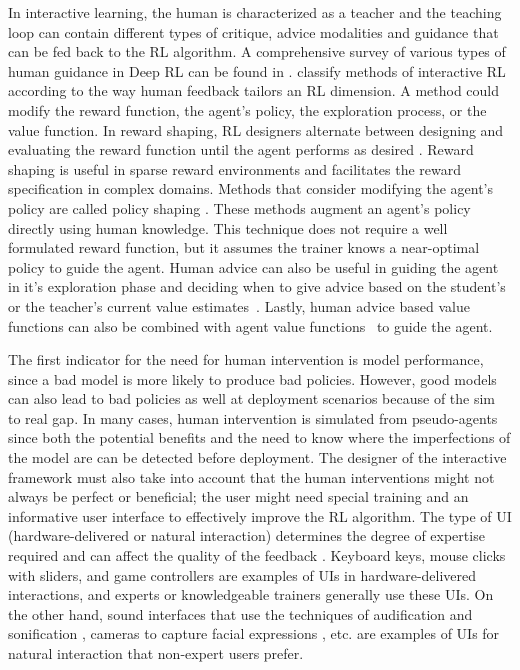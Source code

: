 \documentclass[twoside,11pt]{article}
\begin{document}
In interactive learning, the human is characterized as a teacher and the teaching loop can contain different types of critique, advice modalities and guidance that can be fed back to the RL algorithm. A comprehensive survey of various types of human guidance in Deep RL can be found in \cite{zhang2019leveraging}. \cite{Arzate:2020:SurveyInteractiveRL} classify methods of interactive RL according to the way human feedback tailors an RL dimension. A method could modify the reward function, the agent's policy, the exploration process, or the value function.  In reward shaping, RL designers alternate between designing and evaluating the reward function until the agent performs as desired \citep{ng:99}. Reward shaping is useful in sparse reward environments and facilitates the reward specification in complex domains. Methods that consider modifying the agent's policy are called policy shaping \citep{griffith2013policy}. These methods augment an agent's policy directly using human knowledge. This technique does not require a well formulated reward function, but it assumes the trainer knows a near-optimal policy to guide the agent. Human advice can also be useful in guiding the agent in it’s exploration phase and deciding when to give advice based on the student’s or the teacher’s current value estimates~\citep{amir2016interactive}. Lastly, human advice based value functions can also be combined with agent value functions~\citep{taylor2011integrating} to guide the agent. 


The first indicator for the need for human intervention is model performance, since a bad model is more likely to produce bad policies. However, good models can also lead to bad policies as well at deployment scenarios because of the sim to real gap. In many cases, human intervention is simulated from pseudo-agents since both the potential benefits and the need to know where the imperfections of the model are can be detected before deployment. The designer of the interactive framework must also take into account that the human interventions might not always be perfect or beneficial; the user might need special training and an informative user interface to effectively improve the RL algorithm. 
The type of UI (hardware-delivered or natural interaction) determines the degree of expertise required and can affect the quality of the feedback \citep{lin:20}. Keyboard keys, mouse clicks with sliders, and game controllers are examples of UIs in hardware-delivered interactions, and experts or knowledgeable trainers generally use these UIs. On the other hand, sound interfaces that use the techniques of audification and sonification \citep{Hermann:2011:Sonification, Saranti:2009:QuantumHarmonicOscSonification,kartoun:10,Scurto:2021:DesigningDeepRLHumanParameterExploration}, cameras to capture facial expressions \citep{arakawa:18}, etc. are examples of UIs for natural interaction that non-expert users prefer. 
\end{document}
